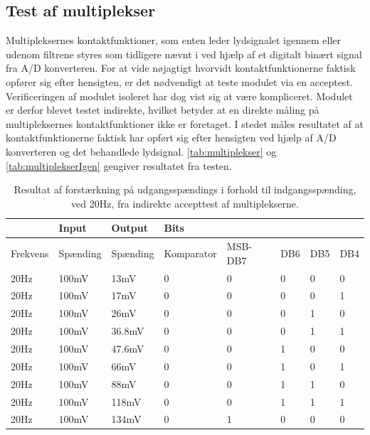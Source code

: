 \subsection{Test af multiplekser}
Multipleksernes kontaktfunktioner, som enten leder lydsignalet igennem eller udenom filtrene styres som tidligere nævnt i  ved hjælp af et digitalt binært signal fra A/D konverteren. For at vide nøjagtigt hvorvidt kontaktfunktionerne faktisk opfører sig efter hensigten, er det nødvendigt at teste modulet via en acceptest. Verificeringen af modulet isoleret har dog vist sig at være kompliceret. Modulet er derfor blevet testet indirekte, hvilket betyder at en direkte måling på multipleksernes kontaktfunktioner ikke er foretaget. I stedet måles resultatet af at kontaktfunktionerne faktisk har opført sig efter hensigten ved hjælp af A/D konverteren og det behandlede lydsignal. \autoref{tab:multiplekser} og \autoref{tab:multiplekserIgen} gengiver resultatet fra testen.\\        
%
\begin{table}[H]
\centering
\begin{tabular}{|l|l|l|l|l|l|l|l|}
\hline
& Input & Output & Bits &  &  &  &  \\ \hline
Frekvens & Spænding & Spænding & Komparator & MSB-DB7 & DB6 & DB5 & DB4 \\ \hline
20Hz & 100mV & 13mV & 0 & 0 & 0 & 0 & 0 \\ \hline
20Hz & 100mV & 17mV & 0 & 0 & 0 & 0 & 1 \\ \hline
20Hz & 100mV & 26mV & 0 & 0 & 0 & 1 & 0 \\ \hline
20Hz & 100mV & 36.8mV & 0 & 0 & 0 & 1 & 1 \\ \hline
20Hz & 100mV & 47.6mV & 0 & 0 & 1 & 0 & 0 \\ \hline
20Hz & 100mV & 66mV & 0 & 0 & 1 & 0 & 1 \\ \hline
20Hz & 100mV & 88mV & 0 & 0 & 1 & 1 & 0 \\ \hline
20Hz & 100mV & 118mV & 0 & 0 & 1 & 1 & 1 \\ \hline
20Hz & 100mV & 134mV & 0 & 1 & 0 & 0 & 0 \\ \hline
\end{tabular}
\caption{Resultat af forstærkning på udgangsspændings i forhold til indgangsspænding, ved 20Hz, fra indirekte accepttest af multiplekserne.}
\label{tab:multiplekser}
\end{table}
%
